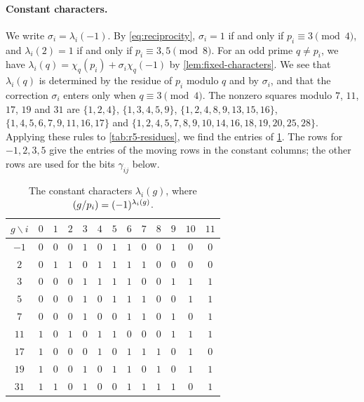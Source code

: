 \paragraph{Constant characters.} We write $\sigma_i=\lambda_i(-1)$. By \eqref{eq:reciprocity}, $\sigma_i=1$ if and only if $p_i\equiv3\pmod4$, and $\lambda_i(2)=1$ if and only if $p_i\equiv3,5\pmod8$. For an odd prime $q\ne p_i$, we have $\lambda_i(q)=\chi_q(p_i)+\sigma_i\chi_q(-1)$ by \cref{lem:fixed-characters}. We see that $\lambda_i(q)$ is determined by the residue of $p_i$ modulo $q$ and by $\sigma_i$, and that the correction $\sigma_i$ enters only when $q\equiv3\pmod4$. The nonzero squares modulo $7$, $11$, $17$, $19$ and $31$ are $\{1,2,4\}$, $\{1,3,4,5,9\}$, $\{1,2,4,8,9,13,15,16\}$, $\{1,4,5,6,7,9,11,16,17\}$ and $\{1,2,4,5,7,8,9,10,14,16,18,19,20,25,28\}$. Applying these rules to \cref{tab:r5-residues}, we find the entries of \cref{tab:r5-const-char}. The rows for $-1,2,3,5$ give the entries of the moving rows in the constant columns; the other rows are used for the bits $\gamma_{ij}$ below.

\begin{table}[htbp]
\centering
\caption{The constant characters $\lambda_i(g)$, where $\leg g{p_i}=(-1)^{\lambda_i(g)}$.}\label{tab:r5-const-char}
\begin{tabular}{c*{12}{c}}
\toprule
$g\backslash i$ & $0$ & $1$ & $2$ & $3$ & $4$ & $5$ & $6$ & $7$ & $8$ & $9$ & $10$ & $11$\\
\midrule
$-1$ & $0$ & $0$ & $0$ & $1$ & $0$ & $1$ & $1$ & $0$ & $0$ & $1$ & $0$ & $0$\\
$2$ & $0$ & $1$ & $1$ & $0$ & $1$ & $1$ & $1$ & $1$ & $0$ & $0$ & $0$ & $0$\\
$3$ & $0$ & $0$ & $0$ & $1$ & $1$ & $1$ & $1$ & $0$ & $0$ & $1$ & $1$ & $1$\\
$5$ & $0$ & $0$ & $0$ & $1$ & $0$ & $1$ & $1$ & $1$ & $0$ & $0$ & $1$ & $1$\\
\midrule
$7$ & $0$ & $0$ & $0$ & $1$ & $0$ & $0$ & $1$ & $1$ & $0$ & $1$ & $0$ & $1$\\
$11$ & $1$ & $0$ & $1$ & $0$ & $1$ & $1$ & $0$ & $0$ & $0$ & $1$ & $1$ & $1$\\
$17$ & $1$ & $0$ & $0$ & $0$ & $1$ & $0$ & $1$ & $1$ & $1$ & $0$ & $1$ & $0$\\
$19$ & $1$ & $0$ & $0$ & $1$ & $0$ & $1$ & $1$ & $0$ & $1$ & $0$ & $1$ & $1$\\
$31$ & $1$ & $1$ & $0$ & $1$ & $0$ & $0$ & $1$ & $1$ & $1$ & $1$ & $0$ & $1$\\
\bottomrule
\end{tabular}
\end{table}

